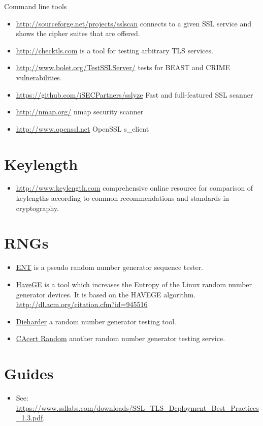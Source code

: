 Command line tools
\begin{itemize}
  \item \url{http://sourceforge.net/projects/sslscan} connects to a given SSL service and shows the cipher suites that are offered.
  \item \url{http://checktls.com} is a tool for testing arbitrary TLS services. 
  \item \url{http://www.bolet.org/TestSSLServer/} tests for BEAST and CRIME vulnerabilities.
  \item \url{https://github.com/iSECPartners/sslyze} Fast and full-featured SSL scanner
  \item \url{http://nmap.org/} nmap security scanner
  \item \url{http://www.openssl.net} OpenSSL s\_client
\end{itemize}


\section{Keylength}
\begin{itemize}
  \item \url{http://www.keylength.com} comprehensive online resource for comparison of keylengths according to common recommendations and standards in cryptography.
\end{itemize}


\section{RNGs}

\begin{itemize}
  \item \href{http://www.fourmilab.ch/random/}{ENT} is a pseudo random number generator sequence tester.
  \item \href{http://www.issihosts.com/haveged/}{HaveGE} is a tool which increases the Entropy of the Linux random number generator devices. It is based on the HAVEGE algorithm. \url{http://dl.acm.org/citation.cfm?id=945516}
  \item \href{http://www.phy.duke.edu/~rgb/General/dieharder.php}{Dieharder} a random number generator testing tool.
  \item \href{http://www.cacert.at/random/}{CAcert Random} another random number generator testing service.
\end{itemize}

\section{Guides}
\begin{itemize}
  \item See: \url{https://www.ssllabs.com/downloads/SSL_TLS_Deployment_Best_Practices_1.3.pdf}.
\end{itemize}
